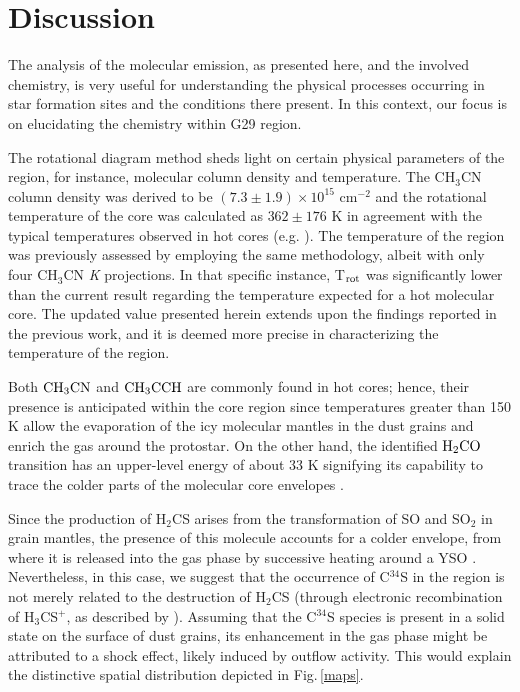 \documentclass[baaa]{baaa}
\begin{document}
\section{Discussion}

The analysis of the molecular emission, as presented here, and the involved chemistry, is very useful for understanding the physical processes occurring in star formation sites and the conditions there present. In this context, our focus is on elucidating the chemistry within G29 region.

The rotational diagram method sheds light on certain physical parameters of the region, for instance, molecular column density and temperature. The CH$_{3}$CN column density was derived to be $(7.3\pm1.9)\times10^{15}$ cm$^{-2}$ and the rotational temperature of the core was calculated as $362\pm176$ K in agreement with the typical temperatures observed in hot cores (e.g. \citealt{ortega23}). The temperature of the region was previously assessed by \cite{areal20} employing the same methodology, albeit with only four CH$_{3}$CN {\it K} projections. In that specific instance, T$\rm_{rot}$ was significantly lower than the current result regarding the temperature expected for a hot molecular core. 
The updated value presented herein extends upon the findings reported in the previous work, and it is deemed more precise in characterizing the temperature of the region.

Both $\rm CH_{3}CN$ and $\rm CH_{3}CCH$ are commonly found in hot cores; hence, their presence is anticipated within the core region since temperatures greater than 150 K allow the evaporation of the icy molecular mantles in the dust grains and enrich the gas around the protostar. On the other hand, the identified $\rm H_{2}CO$ transition has an upper-level energy of about 33 K 
signifying its capability to trace the colder parts of the molecular core envelopes \citep{dima}.


Since the production of H$_{2}$CS arises from the transformation of SO and SO$_{2}$ in grain mantles, the presence of this molecule accounts for a colder envelope, from where it is released into the gas phase by successive heating around a YSO \citep{minh}. Nevertheless, in this case, we suggest that the occurrence of C$^{34}$S in the region is not merely related to the destruction of H$_{2}$CS (through electronic recombination of H$_{3}$CS$^{+}$, as described by \citealt{charnley}). Assuming that the C$^{34}$S
species is present in a solid state on the surface of dust
grains, its enhancement in the gas phase
might be attributed to a shock effect, likely induced by
outflow activity. This would explain the distinctive spatial distribution depicted in Fig.\,\ref{maps}.
\end{document}

